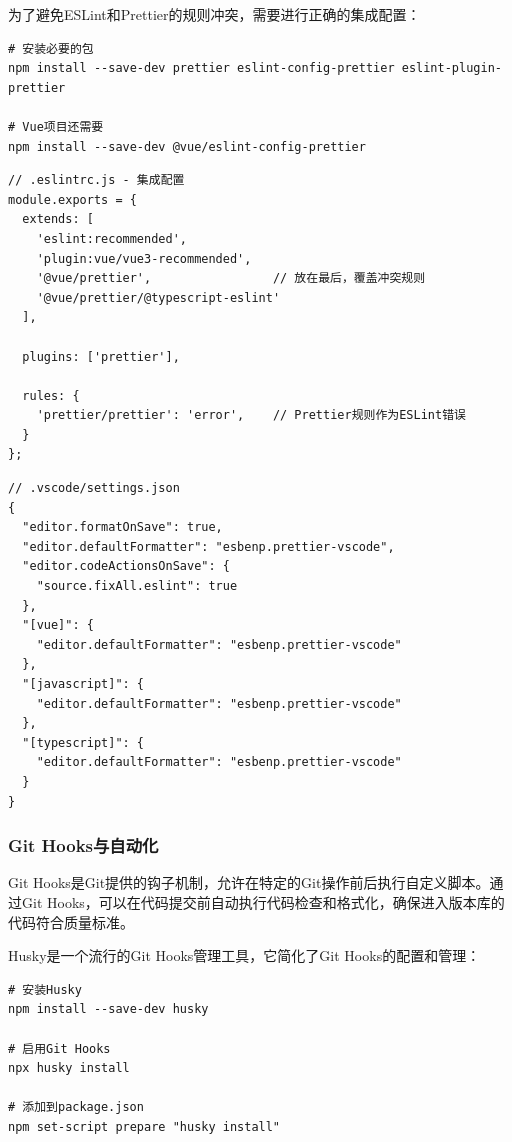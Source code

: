 
为了避免ESLint和Prettier的规则冲突，需要进行正确的集成配置：

\begin{lstlisting}[style=terminal]
# 安装必要的包
npm install --save-dev prettier eslint-config-prettier eslint-plugin-prettier

# Vue项目还需要
npm install --save-dev @vue/eslint-config-prettier
\end{lstlisting}

\begin{lstlisting}[style=javascript]
// .eslintrc.js - 集成配置
module.exports = {
  extends: [
    'eslint:recommended',
    'plugin:vue/vue3-recommended',
    '@vue/prettier',                 // 放在最后，覆盖冲突规则
    '@vue/prettier/@typescript-eslint'
  ],
  
  plugins: ['prettier'],
  
  rules: {
    'prettier/prettier': 'error',    // Prettier规则作为ESLint错误
  }
};
\end{lstlisting}


\begin{lstlisting}[style=json]
// .vscode/settings.json
{
  "editor.formatOnSave": true,
  "editor.defaultFormatter": "esbenp.prettier-vscode",
  "editor.codeActionsOnSave": {
    "source.fixAll.eslint": true
  },
  "[vue]": {
    "editor.defaultFormatter": "esbenp.prettier-vscode"
  },
  "[javascript]": {
    "editor.defaultFormatter": "esbenp.prettier-vscode"
  },
  "[typescript]": {
    "editor.defaultFormatter": "esbenp.prettier-vscode"
  }
}
\end{lstlisting}

\hypertarget{git-hooksux4e0eux81eaux52a8ux5316}{%
\subsubsection{Git Hooks与自动化}\label{git-hooksux4e0eux81eaux52a8ux5316}}

Git Hooks是Git提供的钩子机制，允许在特定的Git操作前后执行自定义脚本。通过Git Hooks，可以在代码提交前自动执行代码检查和格式化，确保进入版本库的代码符合质量标准。


Husky是一个流行的Git Hooks管理工具，它简化了Git Hooks的配置和管理：

\begin{lstlisting}[style=terminal]
# 安装Husky
npm install --save-dev husky

# 启用Git Hooks
npx husky install

# 添加到package.json
npm set-script prepare "husky install"
\end{lstlisting}

